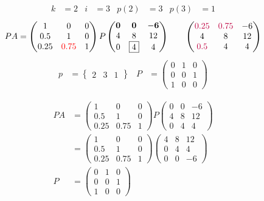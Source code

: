 \documentclass[pdf]{beamer}
\begin{document}
\begin{frame}{}\begin{align*} k &= 2 & i &= 3 & p(2) &= 3 & p(3) &= 1\end{align*}$$PA=\begin{pmatrix}1&0&0\\0.5&1&0\\0.25&{\color{red}0.75}&1\end{pmatrix} P \begin{pmatrix}\mathbf{0}&\mathbf{0}&\mathbf{-6}\\4&8&12\\0&\boxed{4}&4\end{pmatrix} \quad\quad \begin{pmatrix}{\color{purple}0.25}&{\color{purple}0.75}&-6\\4&8&12\\{\color{purple}0.5}&4&4\end{pmatrix}$$\begin{align*} p&= \begin{Bmatrix}2&3&1\end{Bmatrix} & P&= \begin{pmatrix}0&1&0\\0&0&1\\1&0&0\end{pmatrix} \end{align*}\end{frame}
\begin{frame}{}\begin{align*}PA&=\begin{pmatrix}1&0&0\\0.5&1&0\\0.25&0.75&1\end{pmatrix} P \begin{pmatrix}0&0&-6\\4&8&12\\0&4&4\end{pmatrix}\\&= \begin{pmatrix}1&0&0\\0.5&1&0\\0.25&0.75&1\end{pmatrix} \begin{pmatrix}4&8&12\\0&4&4\\0&0&-6\end{pmatrix} \\ P&= \begin{pmatrix}0&1&0\\0&0&1\\1&0&0\end{pmatrix}\end{align*}
\end{frame}
\end{document}
